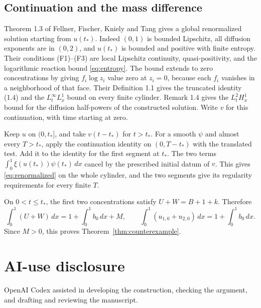 \documentclass[11pt]{article}
\begin{document}
\subsection{Continuation and the mass difference}

Theorem 1.3 of Fellner, Fischer, Kniely and Tang \cite{FFKT} gives a
global renormalized solution starting from \(u(t_*)\). Indeed
\((0,1)\) is bounded Lipschitz, all diffusion exponents are in
\((0,2)\), and \(u(t_*)\) is bounded and positive with finite entropy.
Their conditions (F1)--(F3) are local Lipschitz continuity,
quasi-positivity, and the logarithmic reaction bound \eqref{eq:entropy}.
The bound extends to zero concentrations by giving \(f_i\log z_i\) value
zero at \(z_i=0\), because each \(f_i\) vanishes in a neighborhood of
that face. Their Definition 1.1 gives the truncated identity (1.4) and
the \(L^\infty_tL^1_x\) bound on every finite cylinder. Remark 1.4
gives the \(L^2_tH^1_x\) bound for the diffusion half-powers of the
constructed solution. Write \(v\) for this continuation, with time
starting at zero.

Keep \(u\) on \((0,t_*]\), and take \(v(t-t_*)\) for \(t>t_*\).
For a smooth \(\psi\) and almost every \(T>t_*\), apply the
continuation identity on \((0,T-t_*)\) with the translated test.
Add it to the identity for the first segment at \(t_*\).
The two terms \(\int_0^1 \xi(u(t_*))\psi(t_*)\,dx\) cancel by the
prescribed initial datum of \(v\). This gives
\eqref{eq:renormalized} on the whole cylinder, and the two segments
give its regularity requirements for every finite \(T\).

On \(0<t\le t_*\), the first two concentrations satisfy
\(U+W=B+1+k\). Therefore
\[
 \int_0^1(U+W)\,dx
 =1+\int_0^1 b_0\,dx+M,\qquad
 \int_0^1(u_{1,0}+u_{2,0})\,dx=1+\int_0^1 b_0\,dx .
\]
Since \(M>0\), this proves Theorem~\ref{thm:counterexample}.

\section*{AI-use disclosure}
OpenAI Codex assisted in developing the construction, checking the argument,
and drafting and reviewing the manuscript.
\end{document}
